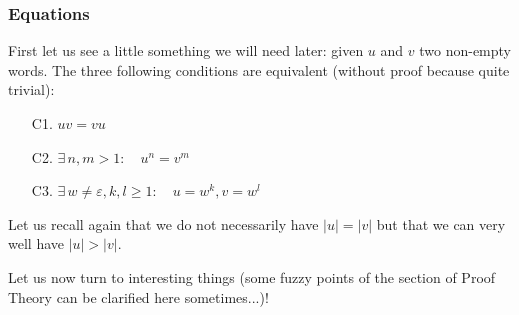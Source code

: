 	
	\subsubsection{Equations}
	First let us see a little something we will need later: given $u$ and $v$ two non-empty words. The three following conditions are equivalent (without proof because quite trivial):
	\begin{enumerate}
		\item[C1.] $uv=vu$
		\item[C2.] $\exists\, n,m>1:\quad u^n=v^m$
		\item[C3.] $\exists\, w\neq\varepsilon, k,l\ge 1:\quad u=w^k,v=w^l$ 
	\end{enumerate}
	\begin{tcolorbox}[title=Remark,colframe=black,arc=10pt]
	Let us recall again that we do not necessarily have $|u|=|v|$ but that we can very well have $|u|>|v|$.
	\end{tcolorbox}
	Let us now turn to interesting things (some fuzzy points of the section of Proof Theory can be clarified here sometimes...)!
	
